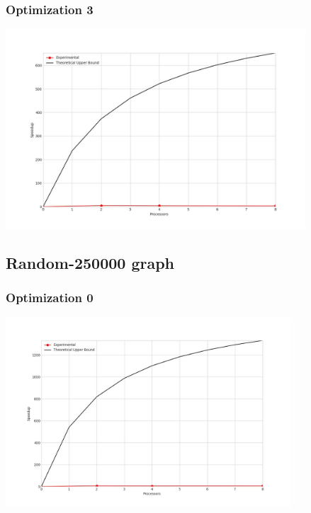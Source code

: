\subsubsection{Optimization 3}
\begin{center}
    \resizebox{0.95\textwidth}{!}{}
    \includegraphics[width=0.84\textwidth]{../img/speedup-graph_type-random-150000-O3}
\end{center}

\clearpage
\subsection{Random-250000 graph}
\subsubsection{Optimization 0}
\begin{center}
    \resizebox{0.95\textwidth}{!}{}
    \includegraphics[width=0.8\textwidth]{../img/speedup-graph_type-random-250000-O0}
\end{center}

